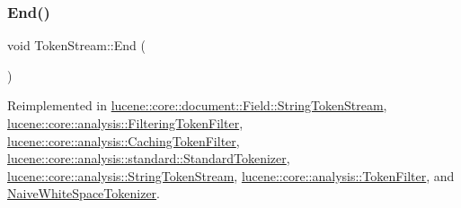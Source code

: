 \mbox{\label{classlucene_1_1core_1_1analysis_1_1TokenStream_a4693985ca7fb242412049a074027b8b5}} 
\subsubsection{\texorpdfstring{End()}{End()}}
{\footnotesize\ttfamily void Token\+Stream\+::\+End (\begin{DoxyParamCaption}{ }\end{DoxyParamCaption})\hspace{0.3cm}{\ttfamily [virtual]}}



Reimplemented in \mbox{\hyperlink{classlucene_1_1core_1_1document_1_1Field_1_1StringTokenStream_acbadfa77de855b030af35f1206231525}{lucene\+::core\+::document\+::\+Field\+::\+String\+Token\+Stream}}, \mbox{\hyperlink{classlucene_1_1core_1_1analysis_1_1FilteringTokenFilter_adf6b7aac9634afdffe1800a369753688}{lucene\+::core\+::analysis\+::\+Filtering\+Token\+Filter}}, \mbox{\hyperlink{classlucene_1_1core_1_1analysis_1_1CachingTokenFilter_a7241be5e51e730f4e311572510de147e}{lucene\+::core\+::analysis\+::\+Caching\+Token\+Filter}}, \mbox{\hyperlink{classlucene_1_1core_1_1analysis_1_1standard_1_1StandardTokenizer_a733b678af865ff10e41fba9b74131872}{lucene\+::core\+::analysis\+::standard\+::\+Standard\+Tokenizer}}, \mbox{\hyperlink{classlucene_1_1core_1_1analysis_1_1StringTokenStream_aabf9a873c934aff5c359417488f33849}{lucene\+::core\+::analysis\+::\+String\+Token\+Stream}}, \mbox{\hyperlink{classlucene_1_1core_1_1analysis_1_1TokenFilter_ad2e29dd32aa4df385d0f290f10f20721}{lucene\+::core\+::analysis\+::\+Token\+Filter}}, and \mbox{\hyperlink{classNaiveWhiteSpaceTokenizer_a4c4f4debc08aa3e05b07b782144b5ae6}{Naive\+White\+Space\+Tokenizer}}.

\mbox{\label{classlucene_1_1core_1_1analysis_1_1TokenStream_a614d4ea24a354d6f4354b4941b5124e2}} 

